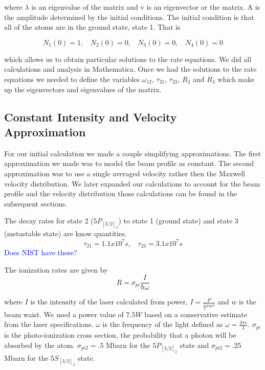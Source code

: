 \documentclass[prb,preprint]{revtex4-1}
\begin{document}
where $\lambda$ is an eigenvalue of the matrix and v is an eigenvector or the matrix.  A is the amplitude determined by the initial conditions. The initial condition is that all of the atoms are in the ground state, state 1. That is

\begin{equation}
\label{InitialCond}
N_1(0) = 1, \	\	\	\	
N_2(0) = 0, \	\	\	\	
N_3(0) = 0, \	\	\	\	
N_4(0) = 0 
\end{equation}

which allows us to obtain particular solutions to the rate equations. We did all calculations and analysis in Mathematica. Once we had the solutions to the rate equations we needed to define the variables $\omega_{12}$, $\tau_{21}$, $\tau_{23}$, $R_2$ and $R_3$ which make up the eigenvectors and eigenvalues of the matrix.

\subsection{Constant Intensity and Velocity Approximation} 

For our initial calculation we made a couple simplifying approximations. The first approximation we made was to model the beam profile as constant. The second approximation was to use a single averaged velocity rather then the Maxwell velocity distribution. We later expanded our calculations to account for the beam profile and the velocity distribution those calculations can be found in the subsequent sections. 

The decay rates for state 2 ($5P_{[3/2]_2}$) to state 1 (ground state) and state 3 (metastable state) are know quantities.
\begin{equation}
\label{DecayRates} 
\tau_{21} = 1.1x10^7 s, \	\	\	\	 \tau_{23} = 3.1x10^7s
\end{equation} 
\textcolor{blue}{Does NIST have these?}

The ionization rates are given by 
\begin{equation}
\label{IonizationRates}
R = \sigma_{pi} \frac{I}{\hbar\omega}
\end{equation}

where $I$ is the intensity of the laser calculated from power, $I = \frac{P}{\frac{1}{2}\pi w^2}$ and $w$ is the beam waist. We used a power value of $7.5 W$ based on a conservative estimate from the laser specifications. $\omega$ is the frequency of the light defined as $\omega = \frac{2\pi c}{\lambda}$. $\sigma_{pi}$ is the photo-ionization cross section, the probability that a photon will be absorbed by the atom. $\sigma_{pi2} = .5$ Mbarn for the $5P_{[3/2]_2}$ state and $\sigma_{pi2} = .25$ Mbarn for the $5S_{[3/2]_2}$ state.~\cite{Cannon}
\end{document}
